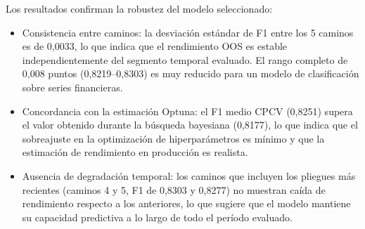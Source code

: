 Los resultados confirman la robustez del modelo seleccionado:

\begin{itemize}

\item Consistencia entre caminos: la desviación estándar de F1 entre los 5 caminos es de 0,0033, lo que indica que el rendimiento OOS es estable independientemente del segmento temporal evaluado. El rango completo de 0,008 puntos (0,8219--0,8303) es muy reducido para un modelo de clasificación sobre series financieras.

\item Concordancia con la estimación Optuna: el F1 medio CPCV (0,8251) supera el valor obtenido durante la búsqueda bayesiana (0,8177), lo que indica que el sobreajuste en la optimización de hiperparámetros es mínimo y que la estimación de rendimiento en producción es realista.

\item Ausencia de degradación temporal: los caminos que incluyen los pliegues más recientes (caminos 4 y 5, F1 de 0,8303 y 0,8277) no muestran caída de rendimiento respecto a los anteriores, lo que sugiere que el modelo mantiene su capacidad predictiva a lo largo de todo el período evaluado.

\end{itemize}

